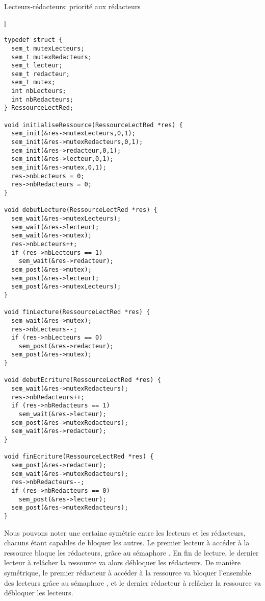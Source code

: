 \begin{algorithm}[h!tp]
\caption{Lecteurs-rédacteurs: priorité aux rédacteurs}\label{lectred:prioriteredacteurs}
\centering
\begin{tabular}{l}
\lstset{language=C++}
\begin{lstlisting}
typedef struct {
  sem_t mutexLecteurs;
  sem_t mutexRedacteurs;
  sem_t lecteur;
  sem_t redacteur;
  sem_t mutex;
  int nbLecteurs;
  int nbRedacteurs;
} RessourceLectRed;

void initialiseRessource(RessourceLectRed *res) {
  sem_init(&res->mutexLecteurs,0,1);
  sem_init(&res->mutexRedacteurs,0,1);
  sem_init(&res->redacteur,0,1);
  sem_init(&res->lecteur,0,1);
  sem_init(&res->mutex,0,1);
  res->nbLecteurs = 0;
  res->nbRedacteurs = 0;
}

void debutLecture(RessourceLectRed *res) {
  sem_wait(&res->mutexLecteurs);
  sem_wait(&res->lecteur);
  sem_wait(&res->mutex);
  res->nbLecteurs++;
  if (res->nbLecteurs == 1)
    sem_wait(&res->redacteur);
  sem_post(&res->mutex);
  sem_post(&res->lecteur);
  sem_post(&res->mutexLecteurs);
}

void finLecture(RessourceLectRed *res) {
  sem_wait(&res->mutex);
  res->nbLecteurs--;
  if (res->nbLecteurs == 0)
    sem_post(&res->redacteur);
  sem_post(&res->mutex);
}

void debutEcriture(RessourceLectRed *res) {
  sem_wait(&res->mutexRedacteurs);
  res->nbRedacteurs++;
  if (res->nbRedacteurs == 1)
    sem_wait(&res->lecteur);
  sem_post(&res->mutexRedacteurs);
  sem_wait(&res->redacteur);
}

void finEcriture(RessourceLectRed *res) {
  sem_post(&res->redacteur);
  sem_wait(&res->mutexRedacteurs);
  res->nbRedacteurs--;
  if (res->nbRedacteurs == 0)
    sem_post(&res->lecteur);
  sem_post(&res->mutexRedacteurs);
}
\end{lstlisting}
\end{tabular}

\end{algorithm}

Nous pouvons noter une certaine symétrie entre les lecteurs et les rédacteurs, chacuns étant capables de bloquer les autres. Le premier lecteur à accéder à la ressource bloque les rédacteurs, grâce au sémaphore . En fin de lecture, le dernier lecteur à relâcher la ressource va alors débloquer les rédacteurs. De manière symétrique, le premier rédacteur à accéder à la ressource va bloquer l'ensemble des lecteurs grâce au sémaphore , et le dernier rédacteur à relâcher la ressource va débloquer les lecteurs.

